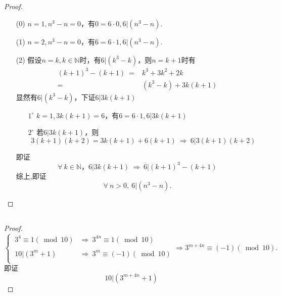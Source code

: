 \documentclass[UTF8]{ctexart}
\begin{document}
\subsection{}   %
\begin{proof}
    \begin{enumerate}
        \item []
        \item [(0)]$n=1,n^3-n=0$，有$0=6\cdot 0,6|(n^3-n)$.
        \item [(1)]$n=2,n^3-n=0$，有$6=6\cdot 1,6|(n^3-n)$.
        \item [(2)]假设$n=k,k\in \mathbb{N}$时，有$6|(k^3-k)$，则$n=k+1$时有
        \begin{align*}
            {(k+1)}^3 - (k+1)\ 
            = & k^3 + 3k^2 + 2k\\
            = & (k^3-k) + 3k(k+1)
        \end{align*}
        显然有$6|(k^3-k)$，下证$6|3k(k+1)$
        \begin{enumerate}
            \item [$1^\circ$]$k=1,3k(k+1)=6$，有$6=6\cdot 1,6|3k(k+1)$
            \item [$2^\circ$]若$6|3k(k+1)$，则
            \[
                3(k+1)(k+2)=3k(k+1)+6(k+1)  
                \ \Rightarrow\ 
                6|3(k+1)(k+2)
            \]
        \end{enumerate}
        即证
        \[
            \forall\ k\in \mathbb{N}，6|3k(k+1)  
            \ \Rightarrow\ 
            6|{(k+1)}^3 - (k+1)
        \]
        综上,即证
        \[
            \forall\ n>0,\ 6|(n^3-n).
        \]
    \end{enumerate}
\end{proof}

\subsection{}   %
\begin{proof}
    \[
        \begin{cases}
            \ 3^4 \equiv 1(\bmod 10) & \Rightarrow\ 3^{4n} \equiv 1(\bmod 10)\\
            \\
            \ 10 |(3^m+1)   & \Rightarrow\ 3^m \equiv (-1) (\bmod 10)\\
        \end{cases}
        \Rightarrow
        3^{m+4n}\equiv (-1)(\bmod 10).
    \]
    即证 
    \[
        10|(3^{m+4n}+1)
    \]
\end{proof}
\end{document}
